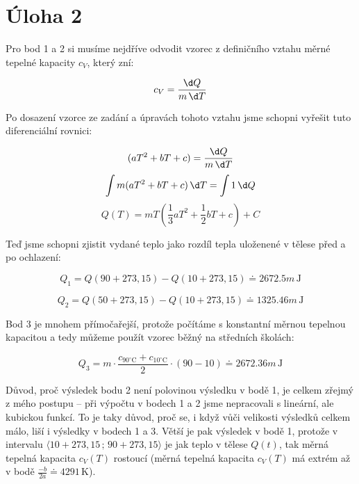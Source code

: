 \documentclass{fkssolpub}
\author{Ondřej Sedláček}
\begin{document}
 

\section{Úloha 2}

Pro bod 1 a 2 si musíme nejdříve odvodit vzorec z definičního vztahu měrné tepelné
kapacity $c_V$, který zní:

\[
  c_V = \frac{\d Q}{m \, \d T}
\]

Po dosazení vzorce ze zadání a úpravách tohoto vztahu jsme schopni vyřešit tuto
diferenciální rovnici:

\[
  (aT^2 + bT + c) = \frac{\d Q}{m \, \d T}
\]
\[
  \int m (aT^2 + bT + c) \, \d T = \int 1 \, \d Q
\]
\[
  Q(T) = m T \left(\frac{1}{3} aT^2 + \frac{1}{2} bT + c\right) + C
\]

Teď jsme schopni zjistit vydané teplo jako rozdíl tepla uloženené v tělese před a
po ochlazení:

\[
  Q_1 = Q(90 + 273{,}15) - Q(10 + 273{,}15) \doteq 2672.5 m \, \text{J}
\]

\[
  Q_2 = Q(50 + 273{,}15) - Q(10 + 273{,}15) \doteq 1325.46 m \, \text{J}
\]

Bod 3 je mnohem přímočařejší, protože počítáme s konstantní měrnou tepelnou kapacitou
a tedy můžeme použít vzorec běžný na středních školách:

\[
  Q_3 = m \cdot \frac{c_{90^\circ \text{C}} + c_{10^\circ \text{C}}}{2} \cdot (90 - 10)
    \doteq 2672.36 m \, \text{J}
\]

Důvod, proč výsledek bodu 2 není polovinou výsledku v bodě 1, je celkem zřejmý z mého
postupu -- při výpočtu v bodech 1 a 2 jsme nepracovali s lineární, ale kubickou
funkcí. To je taky důvod, proč se, i když vůči velikosti výsledků celkem málo, liší i 
výsledky v bodech 1 a 3. Větší je pak výsledek v bodě 1, protože v intervalu
$\langle 10 + 273{,}15 \, ; \, 90 + 273{,}15 \rangle$ je jak teplo v tělese $Q(t)$, tak
měrná tepelná kapacita $c_V(T)$ rostoucí (měrná tepelná kapacita $c_V(T)$ má extrém až
v bodě $\frac{-b}{2a} \doteq 4291 \, \text{K}$).
\end{document}

